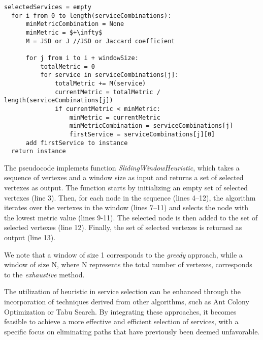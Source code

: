 \begin{lstlisting}[frame=single,mathescape, caption={Sliding Window Heuristic with Selection of First Service from Optimal Combination},label={lst:slidingwindowfirstservice}]
  selectedServices = empty
  for i from 0 to length(serviceCombinations):
      minMetricCombination = None
      minMetric = $+\infty$
      M = JSD or J //JSD or Jaccard coefficient

      for j from i to i + windowSize:
          totalMetric = 0
          for service in serviceCombinations[j]:
              totalMetric += M(service)
              currentMetric = totalMetric / length(serviceCombinations[j])
              if currentMetric < minMetric:
                  minMetric = currentMetric
                  minMetricCombination = serviceCombinations[j]
                  firstService = serviceCombinations[j][0]
      add firstService to instance
  return instance

  \end{lstlisting}

The pseudocode implemets function {\em SlidingWindowHeuristic}, which takes a sequence of vertexes and a window size as input and returns a set of selected vertexes as output. The function starts by initializing an empty set of selected vertexes (line 3). Then, for each node in the sequence (lines 4--12), the algorithm iterates over the vertexes in the window (lines 7--11) and selects the node with the lowest metric value (lines 9-11). The selected node is then added to the set of selected vertexes (line 12). Finally, the set of selected vertexes is returned as output (line 13).

We note that a window of size 1 corresponds to the \emph{greedy} approach, while a window of size N, where N represents the total number of vertexes, corresponds to the \emph{exhaustive} method.

The utilization of heuristic in service selection can be enhanced through the incorporation of techniques derived from other algorithms, such as Ant Colony Optimization or Tabu Search.
By integrating these approaches, it becomes feasible to achieve a more effective and efficient selection of services, with a specific focus on eliminating paths that have previously been deemed unfavorable.

